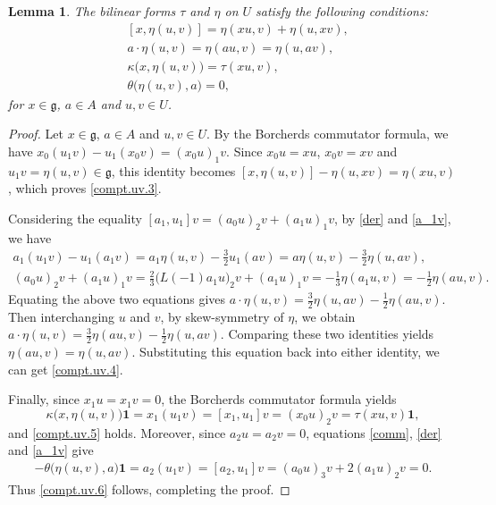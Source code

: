 \documentclass[12pt]{article}
\numberwithin{equation}{section}
\newtheorem{lemma}[theorem]{Lemma}
\theoremstyle{definition}
\theoremstyle{plain}
\newcommand{\fg}{\mathfrak{g}}
\newcommand{\bone}{\mathbf{1 }}
\begin{document}
\begin{lemma}\label{lem:uv.part.1}
    The bilinear forms $\tau$ and $\eta$ on $U$ satisfy the following conditions\textup{:}
    \begin{align}
        &[x,\eta(u,v)]=\eta(xu,v)+\eta(u,xv),\label{compt.uv.3}\\
        &a\cdot\eta(u,v)=\eta(au,v)=\eta(u,av),\label{compt.uv.4}\\
        &\kappa\big(x,\eta(u,v)\big)=\tau(xu,v),\label{compt.uv.5}\\
        &\theta\big(\eta(u,v),a\big)=0,\label{compt.uv.6}
    \end{align}
    for $x\in\fg$, $a\in A$ and $u,v\in U$.
\end{lemma}
\begin{proof}
    Let $x\in\fg$, $a\in A$ and $u,v\in U$. By the Borcherds commutator formula, we have $x_0(u_1v)-u_1(x_0v)=(x_0u)_1v$. Since $x_0u=xu$, $x_0v=xv$ and $u_1v=\eta(u,v)\in\fg$, this identity becomes $[x,\eta(u,v)]-\eta(u,xv)=\eta(xu,v)$, which proves \eqref{compt.uv.3}.

    Considering the equality $[a_1,u_1]v=(a_0u)_2v+(a_1u)_1v$, by \eqref{der} and \eqref{a_1v}, we have
    \begin{gather*}
        a_1(u_1v)-u_1(a_1v)=a_1\eta(u,v)-\frac{3}{2}u_1(av)=a\eta(u,v)-\frac{3}{2}\eta(u,av),\\
        (a_0u)_2v+(a_1u)_1v=\frac{2}{3}\big(L(-1)a_1u\big)_2v+(a_1u)_1v=-\frac{1}{3}\eta(a_1u,v)=-\frac{1}{2}\eta(au,v).
    \end{gather*}
    Equating the above two equations gives $a\cdot \eta(u,v)=\frac{3}{2}\eta(u,av)-\frac{1}{2}\eta(au,v)$. Then interchanging $u$ and $v$, by skew-symmetry of $\eta$, we obtain $a\cdot\eta(u,v)=\frac{3}{2}\eta(au,v)-\frac{1}{2}\eta(u,av)$. Comparing these two identities yields $\eta(au,v)=\eta(u,av)$. Substituting this equation back into either identity, we can get \eqref{compt.uv.4}.

    Finally, since $x_1u=x_1v=0$, the Borcherds commutator formula yields
    \begin{equation*}
        \kappa\big(x,\eta(u,v)\big)\bone=x_1(u_1v)=[x_1,u_1]v=(x_0u)_2v=\tau(xu,v)\bone,
    \end{equation*}
    and \eqref{compt.uv.5} holds. Moreover, since $a_2u=a_2v=0$, equations  \eqref{comm}, \eqref{der} and \eqref{a_1v} give
    \begin{align*}
        -\theta\big(\eta(u,v),a\big)\bone=a_2(u_1v)=[a_2,u_1]v=(a_0u)_3v+2(a_1u)_2v=0.
    \end{align*}
    Thus \eqref{compt.uv.6} follows, completing the proof.
\end{proof}
\end{document}
